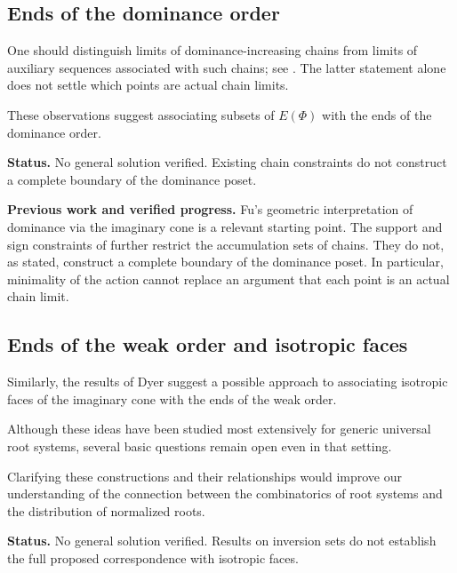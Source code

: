 \documentclass[11pt,reqno]{amsart}
\theoremstyle{plain}
\theoremstyle{definition}
\theoremstyle{remark}
\numberwithin{equation}{section}
\begin{document}
\subsection{Ends of the dominance order}

One should distinguish limits of dominance-increasing chains from
limits of auxiliary sequences associated with such chains; see
\cite[Proposition~6.8(a) and Section~7.7]{DHR}. The latter statement
alone does not settle which points are actual chain limits.

These observations suggest associating subsets of
$E(\Phi)$ with the ends of the dominance order.


\par\medskip
\noindent\textbf{Status.} No general solution verified. Existing chain constraints do not construct a complete boundary of the dominance poset.

\par\medskip
\noindent\textbf{Previous work and verified progress.}
Fu's geometric interpretation of dominance via the imaginary cone
\cite{Fu2013} is a relevant starting point. The support and sign constraints
of \cite[Theorems~4.8 and~4.18]{FuEtAl2026} further restrict the accumulation
sets of chains. They do not, as stated, construct a complete boundary of
the dominance poset. In particular, minimality of the action cannot
replace an argument that each point is an actual chain limit.

\subsection{Ends of the weak order and isotropic faces}

Similarly, the results of Dyer suggest a possible
approach to associating isotropic faces of the imaginary
cone with the ends of the weak order.

Although these ideas have been studied most extensively
for generic universal root systems, several basic
questions remain open even in that setting.

Clarifying these constructions and their relationships
would improve our understanding of the connection
between the combinatorics of root systems and the
distribution of normalized roots.


\par\medskip
\noindent\textbf{Status.} No general solution verified. Results on inversion sets do not establish the full proposed correspondence with isotropic faces.
\end{document}
